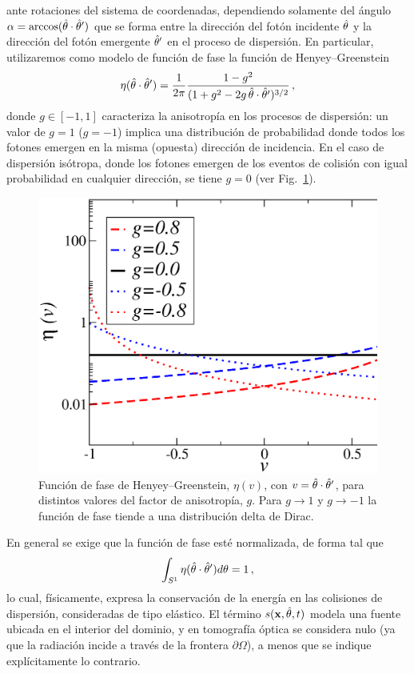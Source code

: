 ante rotaciones del sistema de coordenadas, dependiendo solamente 
del ángulo $\alpha=\arccos(\hat{\theta} \cdot \hat{\theta}')$ que se forma entre la dirección 
del fotón incidente $\hat{\theta}$ y la dirección del fotón emergente $\hat{\theta}'$ 
en el proceso de dispersión. En particular, utilizaremos como modelo de función de fase la 
función de Henyey--Greenstein~\cite{Henyey1941}
\begin{equation}
\eta(\hat{\theta}\cdot\hat{\theta}')=\frac{1}{2\pi} 
\frac{1-g^2}{(1+g^2-2g \, \hat{\theta} \cdot \hat{\theta}')^{3/2}} \,,
\label{eq:Henyey-Greeinstein}
\end{equation}
donde $g \in [-1,1]$ caracteriza la anisotropía en los procesos de dispersión: 
 un valor de $g=1$ ($g=-1$) implica una distribución de probabilidad donde todos
los fotones emergen en la misma (opuesta) dirección de 
incidencia. En el caso de dispersión isótropa, 
donde los fotones emergen de los eventos de colisión con igual probabilidad 
en cualquier dirección, se tiene $ g = 0 $ (ver Fig.~\ref{fig:Henyey--Greenstein}). 
\begin{figure}[h!]
\centering
  \includegraphics[width=0.5\linewidth]{figuras/henyey.eps}
  \caption{Función de fase de Henyey--Greenstein, $\eta(v)$, 
  con $v=\hat{\theta} \cdot \hat{\theta}'$, para distintos valores del factor de anisotropía, $g$. Para $g\to 1$ 
  y $g\to -1$ la función de fase tiende a una distribución delta de Dirac.}
 \label{fig:Henyey--Greenstein}
\end{figure}

En general se exige que la función de fase 
esté normalizada, de forma tal que
\begin{equation}
\int_{S^1}\eta(\hat{\theta}\cdot\hat{\theta}') d\theta=1 \,,
\label{eq:Henyey-Greeinsteinnorm}
\end{equation}
lo cual, físicamente, expresa la conservación de la energía en las colisiones 
de dispersión, consideradas de tipo elástico. El término $ s(\mathbf{x},\hat{\theta},t)$ 
modela una fuente ubicada en el interior del dominio, y en tomografía óptica 
se considera nulo (ya que la radiación incide a través de la frontera $\partial \Omega$), 
a menos que se indique explícitamente lo contrario. 

